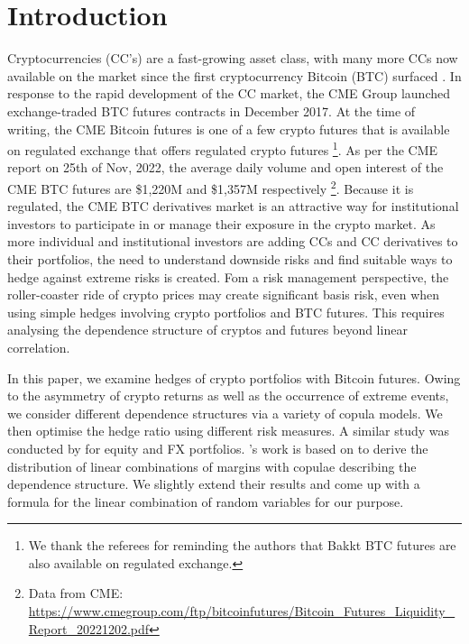\documentclass[11pt,a4paper,english]{article}
\begin{document}
\section{Introduction}\label{sec:introduction}
Cryptocurrencies (CC's) are a fast-growing asset class,
with many more CCs now available on the market since the first
cryptocurrency Bitcoin (BTC) surfaced \citep{nakamoto2009}.
In response to the rapid development of the CC market, the CME Group
launched exchange-traded BTC futures contracts in December
2017.
At the time of writing, the CME Bitcoin futures is one of a few crypto futures that is available on regulated exchange that offers
regulated crypto futures \footnote{We thank the referees for reminding the authors that Bakkt BTC futures are also available on regulated exchange.}. 
As per the CME report on 25th of Nov, 2022, the average daily volume and open interest of the CME BTC futures are
\$1,220M and \$1,357M respectively \footnote{Data from CME: \url{https://www.cmegroup.com/ftp/bitcoinfutures/Bitcoin_Futures_Liquidity_Report_20221202.pdf}}.
Because it is regulated, the CME BTC derivatives market  
is an attractive way for institutional
investors to participate in or manage their exposure in the crypto
market.
As more individual and institutional investors are adding CCs and CC
derivatives to their portfolios, the need to understand
downside risks and find suitable ways to hedge against extreme risks
is created. 
Fom a risk management perspective, the roller-coaster ride
of crypto prices may create significant basis risk, even when using
simple hedges involving crypto portfolios and BTC futures. This
requires analysing the dependence structure of cryptos and
futures beyond linear correlation. 

In this paper, we examine hedges of crypto portfolios
with Bitcoin futures. Owing to the asymmetry of crypto returns as
well as the occurrence of extreme events, we consider different 
dependence structures via a variety of copula models. We then optimise
the hedge ratio using different risk measures. A similar study was
conducted by \citep{barbi2014copula} for equity and FX portfolios.
\citet{barbi2014copula}'s work is based on \citet{cherubini2011copula}
to derive the distribution of linear combinations of margins with
copulae describing the dependence structure. We slightly extend their
results and come up with a formula for the linear combination of
random variables for our purpose.
\end{document}
